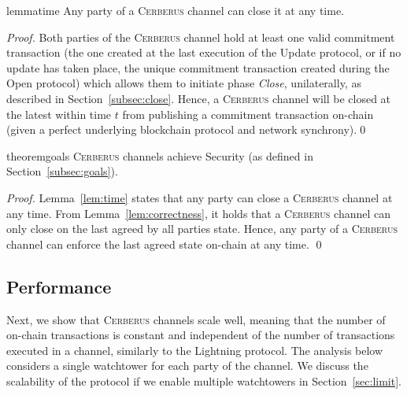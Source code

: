 \documentclass[runningheads]{llncs}
\newcommand{\sys}{\textsc{Cerberus}\xspace}
\begin{document}
\vspace{-4pt}
\begin{restatable}{lemma}{time}\label{lem:time}
Any party of a \sys channel can close it at any time.
\end{restatable}
\begin{proof}
Both parties of the \sys channel hold at least one valid commitment transaction (the one created at the last execution of the Update protocol, or if no update has taken place, the unique commitment transaction created during the Open protocol) which allows them to initiate phase \textit{Close}, unilaterally, as described in Section~\ref{subsec:close}.
Hence, a \sys channel will be closed at the latest within time $t$ from publishing a commitment transaction on-chain (given a perfect underlying blockchain protocol and network synchrony).\hfill \qed
\end{proof}


\vspace{-4pt}
\begin{restatable}{theorem}{goals}
\sys channels achieve Security (as defined in Section~\ref{subsec:goals}).
\end{restatable}
\begin{proof}
Lemma~\ref{lem:time} states that any party can close a \sys channel at any time. From Lemma~\ref{lem:correctness}, it holds that a \sys channel can only close on the last agreed by all parties state. Hence, any party of a \sys channel can enforce the last agreed state on-chain at any time.
\hfill \qed
\end{proof}

\subsection{Performance}

Next, we show that \sys channels scale well, meaning that the number of on-chain transactions is constant and independent of the number of transactions executed in a channel, similarly to the Lightning protocol. The analysis below considers a single watchtower for each party of the channel. We discuss the scalability of the protocol if we enable multiple watchtowers in Section~\ref{sec:limit}.
\end{document}
